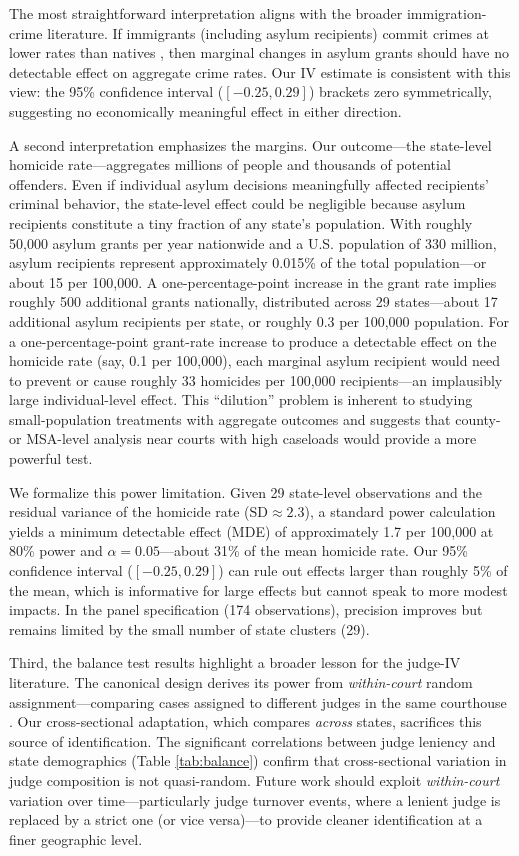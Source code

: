\documentclass[12pt]{article}
\begin{document}
The most straightforward interpretation aligns with the broader immigration-crime literature. If immigrants (including asylum recipients) commit crimes at lower rates than natives \citep{light2020, butcher2007}, then marginal changes in asylum grants should have no detectable effect on aggregate crime rates. Our IV estimate is consistent with this view: the 95\% confidence interval ($[-0.25, 0.29]$) brackets zero symmetrically, suggesting no economically meaningful effect in either direction.

A second interpretation emphasizes the margins. Our outcome---the state-level homicide rate---aggregates millions of people and thousands of potential offenders. Even if individual asylum decisions meaningfully affected recipients' criminal behavior, the state-level effect could be negligible because asylum recipients constitute a tiny fraction of any state's population. With roughly 50,000 asylum grants per year nationwide and a U.S. population of 330 million, asylum recipients represent approximately 0.015\% of the total population---or about 15 per 100,000. A one-percentage-point increase in the grant rate implies roughly 500 additional grants nationally, distributed across 29 states---about 17 additional asylum recipients per state, or roughly 0.3 per 100,000 population. For a one-percentage-point grant-rate increase to produce a detectable effect on the homicide rate (say, 0.1 per 100,000), each marginal asylum recipient would need to prevent or cause roughly 33 homicides per 100,000 recipients---an implausibly large individual-level effect. This ``dilution'' problem is inherent to studying small-population treatments with aggregate outcomes and suggests that county- or MSA-level analysis near courts with high caseloads would provide a more powerful test.

We formalize this power limitation. Given 29 state-level observations and the residual variance of the homicide rate ($\text{SD} \approx 2.3$), a standard power calculation yields a minimum detectable effect (MDE) of approximately 1.7 per 100,000 at 80\% power and $\alpha = 0.05$---about 31\% of the mean homicide rate. Our 95\% confidence interval ($[-0.25, 0.29]$) can rule out effects larger than roughly 5\% of the mean, which is informative for large effects but cannot speak to more modest impacts. In the panel specification (174 observations), precision improves but remains limited by the small number of state clusters (29).

Third, the balance test results highlight a broader lesson for the judge-IV literature. The canonical design derives its power from \textit{within-court} random assignment---comparing cases assigned to different judges in the same courthouse \citep{kling2006, dobbie2018}. Our cross-sectional adaptation, which compares \textit{across} states, sacrifices this source of identification. The significant correlations between judge leniency and state demographics (Table \ref{tab:balance}) confirm that cross-sectional variation in judge composition is not quasi-random. Future work should exploit \textit{within-court} variation over time---particularly judge turnover events, where a lenient judge is replaced by a strict one (or vice versa)---to provide cleaner identification at a finer geographic level.
\end{document}
